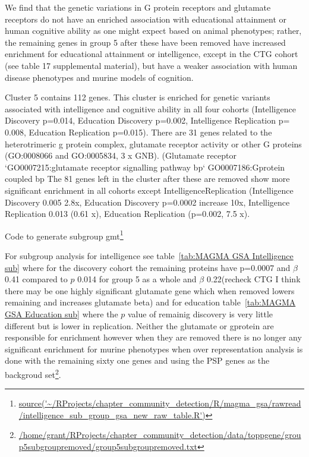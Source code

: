 We find that the genetic variations in G protein receptors and glutamate receptors do not have an enriched association with educational attainment or human cognitive ability as one might expect based on animal phenotypes; rather, the remaining genes in group 5 after these have been removed have increased enrichment for educational attainment or intelligence, except in the CTG cohort (see table 17 supplemental material), but have a weaker association with human disease phenotypes and murine models of cognition. 

Cluster 5 contains 112 genes. This cluster is enriched for genetic variants associated with intelligence and cognitive ability in all four cohorts (Intelligence Discovery p=0.014, Education Discovery p=0.002, Intelligence Replication p= 0.008, Education Replication p=0.015). There are 31 genes related to the heterotrimeric g protein complex, glutamate receptor activity or other G proteins (GO:0008066 and GO:0005834, 3 x GNB). (Glutamate receptor `GO0007215:glutamate receptor signalling pathway bp`  GO0007186:Gprotein coupled bp The 81 genes left in the cluster after these are removed show more significant enrichment in all cohorts except IntelligenceReplication  (Intelligence Discovery 0.005 2.8x, Education Discovery p=0.0002 increase 10x, Intelligence Replication 0.013 (0.61 x), Education Replication (p=0.002, 7.5 x).

Code to generate subgroup gmt\footnote{\tiny\url{source('~/RProjects/chapter_community_detection/R/magma_gsa/rawread/intelligence_sub_group_gsa_new_raw_table.R')}}

For subgroup analysis for intelligence see table~\ref{tab:MAGMA GSA Intelligence sub} where for the discovery cohort the remaining proteins have p=0.0007 and $\beta$ 0.41 compared to $p$ 0.014 for group 5 as a whole and $\beta$ 0.22(recheck CTG I think there may be one highly significant glutamate gene which when removed lowers remaining and increases glutamate beta) and for education table~\ref{tab:MAGMA GSA Education sub} where the $p$ value of remainig discovery is very little different but is lower in replication. Neither the glutamate or gprotein are responsible for enrichment however when they are removed there is no longer any significant enrichment for murine phenotypes when over representation analysis is done with the remaining sixty one genes and using the PSP genes as the backgroud set\footnote{\tiny\url{/home/grant/RProjects/chapter_community_detection/data/toppgene/group5subgroupremoved/group5subgroupremoved.txt}}.



